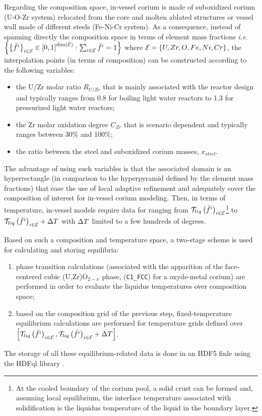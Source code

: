 \documentclass[11pt]{article}\usepackage{geometry} \geometry{letterpaper, margin=25.4mm}
\newcommand{\T}{\texttt}
\newcommand{\Mc}[1]{{\mathcal #1}}
\begin{document}
Regarding the composition space, in-vessel corium is made of suboxidized corium (U-O-Zr system) relocated from the core and molten ablated structures or vessel wall made of different steels (Fe-Ni-Cr system). As a consequence, instead of spanning directly the composition space in terms of element mass fractions \textit{i.e.} $\left\{ \left\{\elementMassFraction[i]{}\right\}_{i\in \elementSet} \in \left[0,1\right]^{\dim(\elementSet)} : \sum_{i\in \elementSet} \elementMassFraction[i]{} = 1 \right\}$ where $\elementSet = \left\{U,Zr,O,Fe,Ni,Cr\right\}$, the interpolation points (in terms of composition) can be constructed according to the following variables:
\begin{itemize}
 \item the U/Zr molar ratio $R_{U/Zr}$ that is mainly associated with the reactor design and typically ranges from 0.8 for boiling light water reactors to 1.3 for pressurized light water reactors;
 \item the Zr molar oxidation degree $C_{Zr}$ that is scenario dependent and typically ranges between 30\% and 100\%;
 \item the ratio between the steel and suboxidized corium masses, $x_{steel}$.
\end{itemize}
The advantage of using such variables is that the associated domain is an hyperrectangle (in comparison to the hyperpyramid defined by the element mass fractions) that ease the use of local adaptive refinement and adequately cover the composition of interest for in-vessel corium modeling. Then, in terms of temperature, in-vessel models require data for ranging from $\Mc{T}_{liq}\left(\elementMassFraction[i]{}\right)_{i\in\elementSet}$\footnote{At the cooled boundary of the corium pool, a solid crust can be formed and, assuming local equilibrium, the interface temperature associated with solidification is the liquidus temperature of the liquid in the boundary layer.} to $\Mc{T}_{liq}\left(\elementMassFraction[i]{}\right)_{i\in\elementSet} + \Delta\temperature{}$ with $\Delta\temperature{}$ limited to a few hundreds of degrees. 

Based on such a composition and temperature space, a two-stage scheme is used for calculating and storing equilibria:
\begin{enumerate}
 \item phase transition calculations (associated with the apparition of the face-centered cubic (U,Zr)O$_{2-x}$ phase, (\T{C1\_FCC}) for a oxyde-metal corium) are performed in order to evaluate the liquidus temperatures over composition space;
 \item based on the composition grid of the previous step, fixed-temperature equilibrium calculations are performed for temperature grids defined over $\left[\Mc{T}_{liq}\left(\elementMassFraction[i]{}\right)_{i\in\elementSet}, \Mc{T}_{liq}\left(\elementMassFraction[i]{}\right)_{i\in\elementSet} + \Delta\temperature{}\right]$.
\end{enumerate}
The storage of all these equilibrium-related data is done in an HDF5 finle using the HDFql library \cite{hdfql}.
\end{document}

